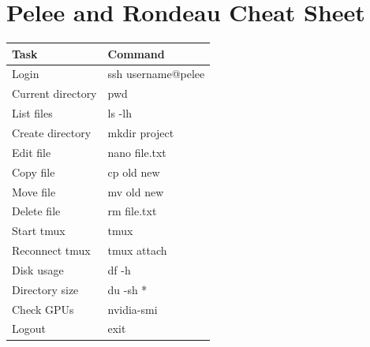 \section{Pelee and Rondeau Cheat Sheet} 

\begin{center} 
\begin{tabular}{ll} 
\toprule 
Task & Command \\ 
\midrule 
Login & ssh username@pelee \\ 
Current directory & pwd \\ 
List files & ls -lh \\ 
Create directory & mkdir project \\ 
Edit file & nano file.txt \\ 
Copy file & cp old new \\ 
Move file & mv old new \\ 
Delete file & rm file.txt \\ 
Start tmux & tmux \\ 
Reconnect tmux & tmux attach \\ 
Disk usage & df -h \\ 
Directory size & du -sh * \\ 
Check GPUs & nvidia-smi \\ 
Logout & exit \\ 
\bottomrule 
\end{tabular} 
\end{center}